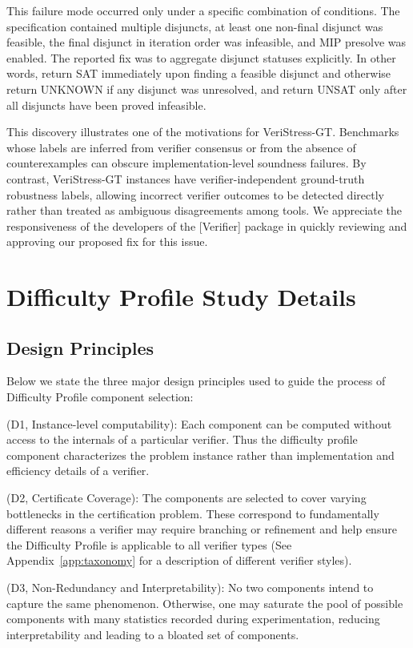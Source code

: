 \documentclass{article}
\theoremstyle{definition}
\begin{document}
This failure mode occurred only under a specific combination of conditions. The specification contained multiple disjuncts, at least one non-final disjunct was feasible, the final disjunct in iteration order was infeasible, and MIP presolve was enabled. The reported fix was to aggregate disjunct statuses explicitly. In other words, return SAT immediately upon finding a feasible disjunct and otherwise return UNKNOWN if any disjunct was unresolved, and return UNSAT only after all disjuncts have been proved infeasible.

This discovery illustrates one of the motivations for VeriStress-GT. Benchmarks whose labels are inferred from verifier consensus or from the absence of counterexamples can obscure implementation-level soundness failures. By contrast, VeriStress-GT instances have verifier-independent ground-truth robustness labels, allowing incorrect verifier outcomes to be detected directly rather than treated as ambiguous disagreements among tools. We appreciate the responsiveness of the developers of the [Verifier] package in quickly reviewing and approving our proposed fix for this issue. 

\section{Difficulty Profile Study Details}\label{app:comp_detail_results}

\subsection{Design Principles}\label{app:design}
Below we state the three major design principles used to guide the process of Difficulty Profile component selection:

(D1, Instance-level computability): Each component can be computed without access to the internals of a particular verifier. Thus the difficulty profile component characterizes the problem instance rather than implementation and efficiency details of a verifier.

(D2, Certificate Coverage): The components are selected to cover varying bottlenecks in the certification problem. These correspond to fundamentally different reasons a verifier may require branching or refinement and help ensure the Difficulty Profile is applicable to all verifier types (See Appendix~\ref{app:taxonomy} for a description of different verifier styles).

(D3, Non-Redundancy and Interpretability): No two components intend to capture the same phenomenon. Otherwise, one may saturate the pool of possible components with many statistics recorded during experimentation, reducing interpretability and leading to a bloated set of components. 
\end{document}
